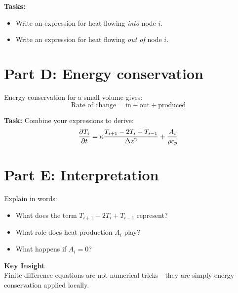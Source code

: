\documentclass[11pt,a4paper]{article}
\begin{document}
\textbf{Tasks:}
\begin{itemize}
    \item Write an expression for heat flowing \emph{into} node $i$.
    \item Write an expression for heat flowing \emph{out of} node $i$.
\end{itemize}

\bigskip

\section*{Part D: Energy conservation}

Energy conservation for a small volume gives:
\[
    \text{Rate of change} = \text{in} - \text{out} + \text{produced}
\]

\textbf{Task:}
Combine your expressions to derive:
\begin{equation}
    \pdv{T_i}{t} =
    \kappa \frac{T_{i+1} - 2T_i + T_{i-1}}{\Delta z^2}
    + \frac{A_i}{\rho c_p}
\end{equation}

\section*{Part E: Interpretation}

Explain in words:

\begin{itemize}
    \item What does the term $T_{i+1} - 2T_i + T_{i-1}$ represent?
    \item What role does heat production $A_i$ play?
    \item What happens if $A_i = 0$?
\end{itemize}

\bigskip

\textbf{Key Insight} \\
Finite difference equations are not numerical tricks—they are simply energy conservation applied locally.
\end{document}
